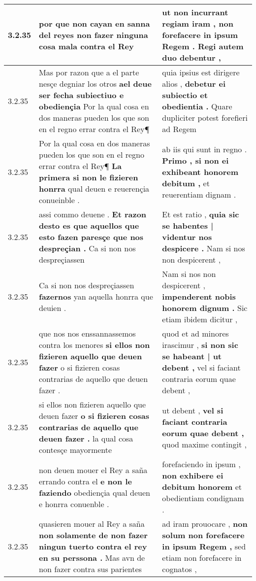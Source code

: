 \begin{tabular}{|p{1cm}|p{6.5cm}|p{6.5cm}|}
3.2.35 & por que non cayan en sanna del reyes \textbf{ non fazer ninguna cosa } mala contra el Rey & ut non incurrant regiam iram , \textbf{ non forefacere in ipsum Regem . } Regi autem duo debentur , \\\hline
3.2.35 & Mas por razon que a el parte nesçe degniar los otros \textbf{ ael deue ser fecha subiectiuo e obediençia } Por la qual cosa en dos maneras pueden los que son en el regno errar contra el Rey¶ & quia ipsius est dirigere alios , \textbf{ debetur ei subiectio et obedientia . } Quare dupliciter potest forefieri ad Regem \\\hline
3.2.35 & Por la qual cosa en dos maneras pueden los que son en el regno errar contra el Rey¶ \textbf{ La primera si non le fizieren honrra } qual deuen e reuerençia conueinble . & ab iis qui sunt in regno . \textbf{ Primo , si non ei exhibeant honorem debitum , } et reuerentiam dignam . \\\hline
3.2.35 & assi commo deuene . \textbf{ Et razon desto es que aquellos que esto fazen paresçe que nos despreçian . } Ca si non nos despreçiassen & Et est ratio , \textbf{ quia sic se habentes | videntur nos despicere . } Nam si nos non despicerent , \\\hline
3.2.35 & Ca si non nos despreçiassen \textbf{ fazernos } yan aquella honrra que deuien . & Nam si nos non despicerent , \textbf{ impenderent nobis honorem dignum . } Sic etiam ibidem dicitur , \\\hline
3.2.35 & que nos nos enssannassemos contra los menores \textbf{ si ellos non fizieren aquello que deuen fazer } o si fizieren cosas contrarias de aquello que deuen fazer . & quod et ad minores irascimur , \textbf{ si non sic se habeant | ut debent , } vel si faciant contraria eorum quae debent , \\\hline
3.2.35 & si ellos non fizieren aquello que deuen fazer \textbf{ o si fizieren cosas contrarias de aquello que deuen fazer . } la qual cosa contesçe mayormente & ut debent , \textbf{ vel si faciant contraria eorum quae debent , } quod maxime contingit , \\\hline
3.2.35 & non deuen mouer el Rey a saña errando contra el \textbf{ e non le faziendo } obediençia qual deuen e honrra conuenble . & forefaciendo in ipsum , \textbf{ non exhibere ei debitum honorem } et obedientiam condignam . \\\hline
3.2.35 & quasieren mouer al Rey a saña \textbf{ non solamente de non fazer ningun tuerto contra el rey en su perssona . } Mas avn de non fazer contra sus parientes & ad iram prouocare , \textbf{ non solum non forefacere in ipsum Regem , } sed etiam non forefacere in cognatos , \\\hline

\end{tabular}
